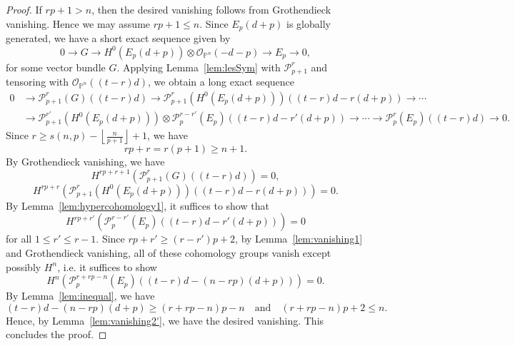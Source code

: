 \documentclass[11pt,letterpaper,reqno]{amsart}
\newcommand{\mc}[1]{\mathcal{#1}}
\def\PP{{\mathbb P}}
\def\lra{\longrightarrow}
\theoremstyle{definition}
\numberwithin{equation}{section}
\begin{document}
\begin{proof}
    If $rp + 1 > n$, then the desired vanishing follows from Grothendieck vanishing. Hence we may assume $rp + 1 \le n$. Since $E_p(d+p)$ is globally generated, we have a short exact sequence given by
    \[0 \lra G \lra H^0(E_p(d+p)) \otimes \mc{O}_{\PP^n}(-d-p) \lra E_p \lra 0,\]
    for some vector bundle $G$. Applying Lemma~\ref{lem:lesSym} with $\mc{P}_{p+1}^r$ and tensoring with $\mc{O}_{\PP^n}((t-r)d)$, we obtain a long exact sequence
    \begin{align*}
        0 &\lra \mc{P}^r_{p+1}(G)((t-r)d) \lra \mc{P}^r_{p+1}(H^0(E_p(d+p)))((t-r)d-r(d+p)) \lra \cdots   \\
        &\lra\mc{P}^{r'}_{p+1}(H^0(E_p(d+p))) \otimes \mc{P}^{r-r'}_p(E_p)((t-r)d-r'(d+p)) \lra \cdots
        \lra\mc{P}^r_p(E_p) ((t-r)d) \lra 0.
    \end{align*}
    Since $r \ge s(n,p) -\left\lfloor \frac{n}{p+1}\right\rfloor + 1 $, we have 
    \[rp+r = r(p+1) \ge n+1.\]
    By Grothendieck vanishing, we have
    \[H^{rp+r+1}(\mc{P}^r_{p+1}(G)((t-r)d)) = 0,\]
    \[H^{rp+r}(\mc{P}^r_{p+1}(H^0(E_p(d+p)))((t-r)d-r(d+p))) = 0.\]
    By Lemma~\ref{lem:hypercohomology1}, it suffices to show that
    \[H^{rp+r'}(\mc{P}^{r-r'}_p(E_p)((t-r)d-r'(d+p))) = 0\]
    for all $1 \le r' \le r-1$. Since $rp+r' \ge (r-r')p+2$, by Lemma~\ref{lem:vanishing1} and Grothendieck vanishing, all of these cohomology groups vanish except possibly $H^n$, i.e. it suffices to show 
    \[H^n(\mc{P}^{r+rp-n}_p(E_p)((t-r)d - (n-rp)(d+p))) = 0.\]
    By Lemma~\ref{lem:inequal}, we have
    \[(t-r)d - (n-rp)(d+p) \ge (r +rp - n)p - n \quad \text{and}\quad (r +rp - n)p +2 \le n.\]
    Hence, by Lemma~\ref{lem:vanishing2'}, we have the desired vanishing. This concludes the proof.
\end{proof}
\end{document}
